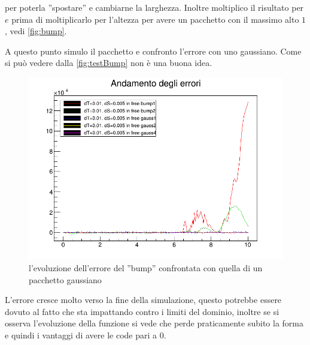 per poterla ''spostare'' e cambiarne la larghezza. Inoltre moltiplico il risultato per $e$ prima di moltiplicarlo per l'altezza per avere un pacchetto con il massimo alto $1$, vedi \autoref{fig:bump}.

A questo punto simulo il pacchetto e confronto l'errore con uno gaussiano. Come si pu\`o vedere dalla \autoref{fig:testBump} non \`e una buona idea.
\begin{figure}
	\centering
	\includegraphics[width=0.7\linewidth]{IMG/testbump}
	\caption[Errore Bump]{l'evoluzione dell'errore del ''bump'' confrontata con quella di un pacchetto gaussiano}\label{fig:testBump}
\end{figure}
L'errore cresce molto verso la fine della simulazione, questo potrebbe essere dovuto al fatto che sta impattando contro i limiti del dominio, inoltre se si osserva l'evoluzione della funzione si vede che perde praticamente subito la forma e quindi i vantaggi di avere le code pari a 0.
